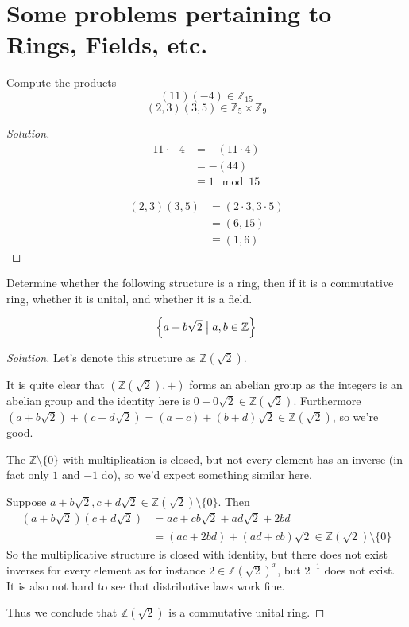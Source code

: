 \newpage 
\section{Some problems pertaining to Rings, Fields, etc.}
\begin{prob}
    Compute the products
    \[
        (11)(-4) \in \mathbb Z_{15}
    \]
    \[
        (2,3)(3,5) \in \mathbb Z_5 \times \mathbb Z_9
    \]
\end{prob}
\begin{proof}[Solution]
    \begin{align*}
        11 \cdot -4 &= -(11 \cdot 4) \\ 
                    &= -(44) \\ 
                    &\equiv 1 \mod 15
    \end{align*}

    \begin{align*}
        (2,3)(3,5) &= (2\cdot 3, 3 \cdot 5) \\ 
                   &= (6, 15) \\ 
                   &\equiv (1,6)
    \end{align*}
\end{proof}
\begin{prob}
    Determine whether the following structure is a ring, 
    then if it is a commutative ring, whether it is unital, 
    and whether it is a field. 

    \[
        \left\{ a + b \sqrt 2 \bigm| a,b \in \mathbb Z \right\}
    \]
\end{prob}
\begin{proof}[Solution]
    Let's denote this structure as $\mathbb Z(\sqrt 2)$.

    It is quite clear that $(\mathbb Z(\sqrt 2), +)$ forms an 
    abelian group as the integers is an abelian group 
    and the identity here is $0 + 0\sqrt 2 \in \mathbb Z(\sqrt 2)$. 
    Furthermore $(a+b\sqrt 2) + (c+d\sqrt 2) = 
    (a+c) + (b+d)\sqrt 2 \in \mathbb Z(\sqrt 2)$, so we're good. 

    The $\mathbb Z \setminus \{0\}$ with multiplication is closed, 
    but not every element has an inverse (in fact only $1$ and $-1$  
    do), so we'd expect something similar here. 

    Suppose $a+b\sqrt 2, c+d\sqrt 2 \in \mathbb Z(\sqrt 2)
    \setminus \{0\}$. Then 
    \begin{align*}
        (a+b\sqrt 2)(c + d\sqrt 2) &= ac + cb\sqrt2 + ad\sqrt 2 
        +2bd \\ 
        &= (ac + 2bd) + (ad + cb)\sqrt 2 \in \mathbb Z(\sqrt 2) 
        \setminus \{0\}
    \end{align*}
    So the multiplicative structure is closed with identity, but 
    there does not exist inverses for every element as for instance
    $2 \in \mathbb Z(\sqrt 2)^x$, but $2^{-1}$ does not exist. 
    It is also not hard to see that distributive laws work fine. 

    Thus we conclude that $\mathbb Z(\sqrt 2)$ is a 
    commutative unital ring. 
\end{proof}
